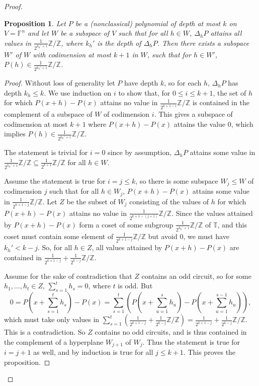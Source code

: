\documentclass{article}
\theoremstyle{plain}
\newtheorem{prop}[theorem]{Proposition}
\theoremstyle{definition}
\theoremstyle{definition}
\theoremstyle{remark}
\numberwithin{equation}{section}
\newcommand{\FF}{\mathbb{F}}
\newcommand{\TT}{\mathbb{T}}
\newcommand{\ZZ}{\mathbb{Z}}
\begin{document}
\begin{proof}
\begin{prop}
Let $P$ be a (nonclassical) polynomial of depth at most $k$ on $V=\FF^n$ and let $W$ be a subspace of $V$ such that for all $h\in W$, $\Delta_h P$ attains all values in $\frac{1}{2^{k_h'+1}}\ZZ/\ZZ$, where $k_h'$ is the depth of $\Delta_h P$. Then there exists a subspace $W'$ of $W$ with codimension at most $k+1$ in $W$, such that for $h\in W'$, $P(h)\in \frac{1}{2^{k_h'+1}}\ZZ/\ZZ$.
\end{prop}

\begin{proof}
Without loss of generality let $P$ have depth $k$, so for each $h$, $\Delta_h P$ has depth $k_h \leq k$. We use induction on $i$ to show that, for $0\leq i\leq k+1$, the set of $h$ for which $P(x+h)-P(x)$ attains no value in $\frac{1}{2^{k+1-i}}\ZZ/\ZZ$ is contained in the complement of a subspace of $W$ of codimension $i$. This gives a subspace of codimension at most $k+1$ where $P(x+h)-P(x)$ attains the value $0$, which implies $P(h)\in \frac{1}{2^{k_h'+1}}\ZZ/\ZZ$.

The statement is trivial for $i=0$ since by assumption, $\Delta_h P$ attains some value in $\frac{1}{2^{k_h'+1}}\ZZ/\ZZ\subseteq \frac{1}{2^{k+1}}\ZZ/\ZZ$ for all $h\in W$.

Assume the statement is true for $i=j\leq k$, so there is some subspace $W_j\leq W$ of codimension $j$ such that for all $h\in W_j$, $P(x+h)-P(x)$ attains some value in $\frac{1}{2^{k+1-j}}\ZZ/\ZZ$. Let $Z$ be the subset of $W_j$ consisting of the values of $h$ for which $P(x+h)-P(x)$ attains no value in $\frac{1}{2^{k+1-(j+1)}}\ZZ/\ZZ$. Since the values attained by $P(x+h)-P(x)$ form a coset of some subgroup $\frac{1}{2^{k_h'+1}}\ZZ/\ZZ$ of $\TT$, and this coset must contain some element of $\frac{1}{2^{k+1-j}}\ZZ/\ZZ$ but avoid $0$, we must have $k_h'<k-j$. So, for all $h\in Z$, all values attained by $P(x+h)-P(x)$ are contained in $\frac{1}{2^{k+1-j}}+\frac{1}{2^{k-j}}\ZZ/\ZZ$.

Assume for the sake of contradiction that $Z$ contains an odd circuit, so for some $h_1,\dots,h_t\in Z$,  $\sum_{s=1}^t h_s =0$, where $t$ is odd. But 
\[0=P\left(x+\sum_{s=1}^t h_s\right)-P(x)=\sum_{s=1}^t \left(P\left(x+\sum_{u=1}^s h_u\right)-P\left(x+\sum_{u=1}^{s-1} h_u\right)\right),\]
which must take only values in $\sum_{s=1}^t \left(\frac{1}{2^{k+1-j}}+\frac{1}{2^{k-j}}\ZZ/\ZZ\right)=\frac{1}{2^{k+1-j}}+\frac{1}{2^{k-j}}\ZZ/\ZZ$. This is a contradiction. So $Z$ contains no odd circuits, and is thus contained in the complement of a hyperplane $W_{j+1}$ of $W_j$. Thus the statement is true for $i=j+1$ as well, and by induction is true for all $j\leq k+1$. This proves the proposition.\end{proof}


\end{proof}
\end{document}
